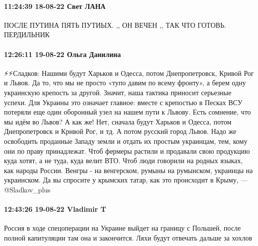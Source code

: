 \paragraph{11:24:39 18-08-22 Свет ЛАНА}

ПОСЛЕ ПУТИНА ПЯТЬ ПУТИЫХ. ,, ОН ВЕЧЕН ,, ТАК ЧТО ГОТОВЬ. ПЕРДИЛЬНИК

\paragraph{12:26:11 19-08-22 Ольга Данилина}

⚡⚡Сладков:
Нашими будут Харьков и Одесса, потом Днепропетровск, Кривой Рог и Львов. Да то, что мы не просто «тупо давим по всему фронту», а берем одну украинскую крепость за другой. Значит, наша тактика приносит серьезные успехи.
Для Украины это означает главное: вместе с крепостью в Песках ВСУ потеряли еще один оборонный узел на нашем пути к Львову.
Есть сомнение, что мы идём во Львов? А как же!
Нет, сначала будут Харьков и Одесса, потом Днепропетровск и Кривой Рог, и тд. А потом русский город Львов.
Надо же освободить проданные Западу земли и отдать их простым украинцам, тем, кому они по праву принадлежат. Чтоб фермеры растили и продавали свою продукцию куда хотят, а не туда, куда велит ВТО.
Чтоб люди говорили на родных языках, как народы России. Венгры - на венгерском, румыны на румынском, украинцы на украинском. Да вы спросите у крымских татар, как это происходит в Крыму, — @Sladkov_plus

\paragraph{12:43:26 19-08-22 Vladimir T}

Россия в ходе спецоперации на Украине выйдет на границу с Польшей, после полной
капитуляции там она и закончится.
Ляхи будут отвечать дальше за хохлов
